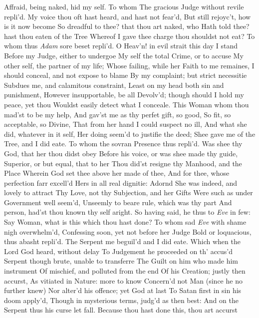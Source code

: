 \documentclass[11pt]{book}
\newcounter {first}
\newcounter {last}
\begin{document}
Affraid, being naked, hid my self.  To whom 
The gracious Judge without revile repli'd. 
\quad My voice thou oft hast heard, and hast not fear'd, 
But still rejoyc't, how is it now become 
So dreadful to thee? that thou art naked, who 
Hath told thee? hast thou eaten of the Tree 
Whereof I gave thee charge thou shouldst not eat? 
\quad To whom thus \textit{Adam} sore beset repli'd. 
O Heav'n! in evil strait this day I stand 
Before my Judge, either to undergoe 
My self the total Crime, or to accuse 
My other self, the partner of my life; 
Whose failing, while her Faith to me remaines, 
I should conceal, and not expose to blame 
By my complaint; but strict necessitie 
Subdues me, and calamitous constraint, 
Least on my head both sin and punishment, 
However insupportable, be all 
Devolv'd; though should I hold my peace, yet thou 
Wouldst easily detect what I conceale. 
This Woman whom thou mad'st to be my help, 
And gav'st me as thy perfet gift, so good, 
So fit, so acceptable, so Divine, 
That from her hand I could suspect no ill, 
And what she did, whatever in it self, 
Her doing seem'd to justifie the deed; 
Shee gave me of the Tree, and I did eate. 
\quad To whom the sovran Presence thus repli'd. 
Was shee thy God, that her thou didst obey 
Before his voice, or was shee made thy guide, 
Superior, or but equal, that to her 
Thou did'st resigne thy Manhood, and the Place 
Wherein God set thee above her made of thee, 
And for thee, whose perfection farr excell'd 
Hers in all real dignitie: Adornd 
She was indeed, and lovely to attract 
Thy Love, not thy Subjection, and her Gifts 
Were such as under Government well seem'd, 
Unseemly to beare rule, which was thy part 
And person, had'st thou known thy self aright. 
\quad So having said, he thus to \textit{Eve} in few: 
Say Woman, what is this which thou hast done? 
\quad To whom sad \textit{Eve} with shame nigh overwhelm'd, 
Confessing soon, yet not before her Judge 
Bold or loquacious, thus abasht repli'd. 
\quad The Serpent me beguil'd and I did eate. 
\quad Which when the Lord God heard, without delay 
To Judgement he proceeded on th' accus'd 
Serpent though brute, unable to transferre 
The Guilt on him who made him instrument 
Of mischief, and polluted from the end 
Of his Creation; justly then accurst, 
As vitiated in Nature: more to know 
Concern'd not Man (since he no further knew) 
Nor alter'd his offence; yet God at last 
To Satan first in sin his doom apply'd, 
Though in mysterious terms, judg'd as then best: 
And on the Serpent thus his curse let fall. 
\quad Because thou hast done this, thou art accurst 
\end{document}
